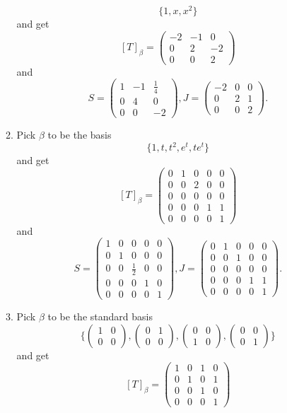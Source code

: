 \begin{enumerate}
\begin{enumerate}
\[\{1,x,x^2\}\]
and get 
\[[T]_{\beta}=\begin{pmatrix}-2&-1&0\\0&2&-2\\0&0&2\end{pmatrix}\]
and 
\[S=\begin{pmatrix}1&-1&\frac{1}{4}\\0&4&0\\0&0&-2\end{pmatrix}, J=\begin{pmatrix}-2&0&0\\0&2&1\\0&0&2\end{pmatrix}.\]
\item Pick $\beta$ to be the basis 
\[\{1,t,t^2,e^t,te^t\}\]
and get 
\[[T]_{\beta}=\begin{pmatrix}0&1&0&0&0\\0&0&2&0&0\\0&0&0&0&0\\0&0&0&1&1\\0&0&0&0&1\end{pmatrix}\]
and 
\[S=\begin{pmatrix}1&0&0&0&0\\0&1&0&0&0\\0&0&\frac{1}{2}&0&0\\0&0&0&1&0\\0&0&0&0&1\end{pmatrix}, J=\begin{pmatrix}0&1&0&0&0\\0&0&1&0&0\\0&0&0&0&0\\0&0&0&1&1\\0&0&0&0&1\end{pmatrix}.\]
\item Pick $\beta$ to be the standard basis 
\[\{\begin{pmatrix}1&0\\0&0\end{pmatrix},\begin{pmatrix}0&1\\0&0\end{pmatrix},\begin{pmatrix}0&0\\1&0\end{pmatrix},\begin{pmatrix}0&0\\0&1\end{pmatrix}\}\]
and get 
\[[T]_{\beta}=\begin{pmatrix}1&0&1&0\\0&1&0&1\\0&0&1&0\\0&0&0&1\end{pmatrix}\]

\end{enumerate}
\end{enumerate}
